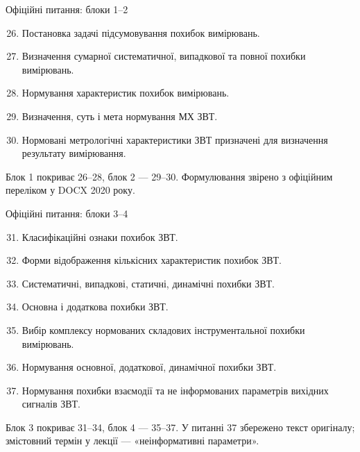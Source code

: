 \documentclass[aspectratio=169,11pt]{beamer}
\begin{document}
\begin{frame}{Офіційні питання: блоки 1–2}
\small
\begin{enumerate}
\setcounter{enumi}{25}
\item Постановка задачі підсумовування похибок вимірювань.
\item Визначення сумарної систематичної, випадкової та повної похибки вимірювань.
\item Нормування характеристик похибок вимірювань.
\item Визначення, суть і мета нормування МХ ЗВТ.
\item Нормовані метрологічні характеристики ЗВТ призначені для визначення результату вимірювання.
\end{enumerate}
\medskip

Блок 1 покриває 26–28, блок 2 — 29–30. Формулювання звірено з офіційним переліком у DOCX 2020 року.
\end{frame}

\begin{frame}{Офіційні питання: блоки 3–4}
\small
\begin{enumerate}
\setcounter{enumi}{30}
\item Класифікаційні ознаки похибок ЗВТ.
\item Форми відображення кількісних характеристик похибок ЗВТ.
\item Систематичні, випадкові, статичні, динамічні похибки ЗВТ.
\item Основна і додаткова похибки ЗВТ.
\item Вибір комплексу нормованих складових інструментальної похибки вимірювань.
\item Нормування основної, додаткової, динамічної похибки ЗВТ.
\item Нормування похибки взаємодії та не інформованих параметрів вихідних сигналів ЗВТ.
\end{enumerate}
\medskip

Блок 3 покриває 31–34, блок 4 — 35–37. У питанні 37 збережено текст оригіналу; змістовний термін у лекції — «неінформативні параметри».
\end{frame}
\end{document}
